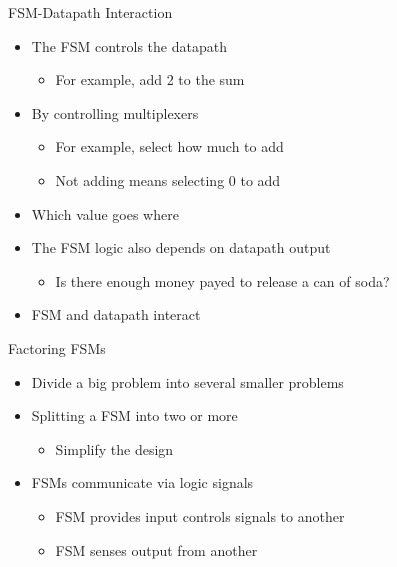 \begin{frame}[fragile]{FSM-Datapath Interaction}
\begin{itemize}
\item The FSM controls the datapath
\begin{itemize}
\item For example, add 2 to the sum
\end{itemize}
\item By controlling multiplexers
\begin{itemize}
\item For example, select how much to add
\item Not adding means selecting 0 to add
\end{itemize}
\item Which value goes where
\item The FSM logic also depends on datapath output
\begin{itemize}
\item Is there enough money payed to release a can of soda?
\end{itemize}
\item FSM and datapath interact
\end{itemize}
\end{frame}





\begin{frame}[fragile]{Factoring FSMs}
\begin{itemize}
\item Divide a big problem into several smaller problems
\item Splitting a FSM into two or more
\begin{itemize}
\item Simplify the design
\end{itemize}
\item FSMs communicate via logic signals
\begin{itemize}
\item FSM provides input controls signals to another
\item FSM senses output from another
\end{itemize}
\end{itemize}
\end{frame}

